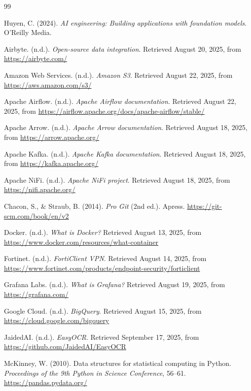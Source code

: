 \documentclass[12pt,oneside,openright,a4paper]{cpe-english-project}
\begin{document}
\begin{thebibliography}{99}

 Huyen, C. (2024). \textit{AI engineering: Building applications with foundation models}. O'Reilly Media.

 Airbyte. (n.d.). \textit{Open-source data integration}. Retrieved August 20, 2025, from \url{https://airbyte.com/}

 Amazon Web Services. (n.d.). \textit{Amazon S3}. Retrieved August 22, 2025, from \url{https://aws.amazon.com/s3/}

 Apache Airflow. (n.d.). \textit{Apache Airflow documentation}. Retrieved August 22, 2025, from \url{https://airflow.apache.org/docs/apache-airflow/stable/}

 Apache Arrow. (n.d.). \textit{Apache Arrow documentation}. Retrieved August 18, 2025, from \url{https://arrow.apache.org/}

 Apache Kafka. (n.d.). \textit{Apache Kafka documentation}. Retrieved August 18, 2025, from \url{https://kafka.apache.org/}

 Apache NiFi. (n.d.). \textit{Apache NiFi project}. Retrieved August 18, 2025, from \url{https://nifi.apache.org/}

 Chacon, S., \& Straub, B. (2014). \textit{Pro Git} (2nd ed.). Apress. \url{https://git-scm.com/book/en/v2}

 Docker. (n.d.). \textit{What is Docker?} Retrieved August 13, 2025, from \url{https://www.docker.com/resources/what-container}

 Fortinet. (n.d.). \textit{FortiClient VPN}. Retrieved August 14, 2025, from \url{https://www.fortinet.com/products/endpoint-security/forticlient}

 Grafana Labs. (n.d.). \textit{What is Grafana?} Retrieved August 19, 2025, from \url{https://grafana.com/}

 Google Cloud. (n.d.). \textit{BigQuery}. Retrieved August 15, 2025, from \url{https://cloud.google.com/bigquery}

 JaidedAI. (n.d.). \textit{EasyOCR}. Retrieved September 17, 2025, from \url{https://github.com/JaidedAI/EasyOCR}

 McKinney, W. (2010). Data structures for statistical computing in Python. \textit{Proceedings of the 9th Python in Science Conference}, 56--61. \url{https://pandas.pydata.org/}


\end{thebibliography}
\end{document}
